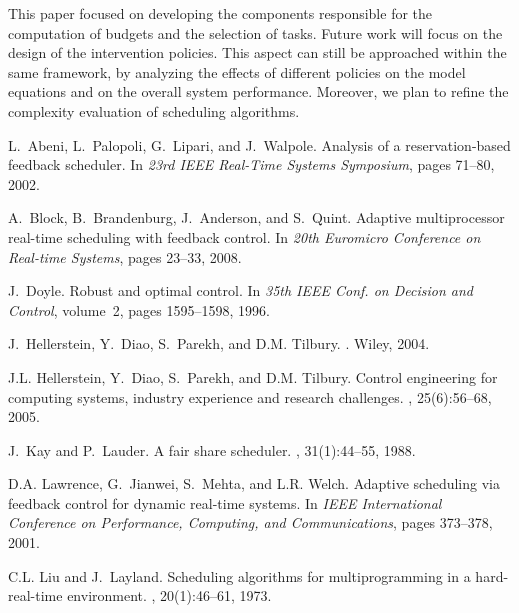 \documentclass[a4paper]{article}
\begin{document}
This paper focused on developing the components responsible for the computation 
of budgets and the selection of tasks.
Future work will focus on the design of the intervention policies.
This aspect can still be approached within the same framework, by analyzing 
the effects of different policies on the model equations and on the overall 
system performance.
Moreover, we plan to refine the complexity evaluation of scheduling algorithms.



\begin{thebibliography}{10}

L.~Abeni, L.~Palopoli, G.~Lipari, and J.~Walpole.
\newblock Analysis of a reservation-based feedback scheduler.
\newblock In {\em 23rd IEEE Real-Time Systems Symposium}, pages 71--80, 2002.

A.~Block, B.~Brandenburg, J.~Anderson, and S.~Quint.
\newblock Adaptive multiprocessor real-time scheduling with feedback control.
\newblock In {\em 20th Euromicro Conference on Real-time Systems}, pages
  23--33, 2008.

J.~Doyle.
\newblock Robust and optimal control.
\newblock In {\em 35th IEEE Conf. on Decision and Control}, volume~2, pages
  1595--1598, 1996.

J.~Hellerstein, Y.~Diao, S.~Parekh, and D.M. Tilbury.
.
\newblock Wiley, 2004.

J.L. Hellerstein, Y.~Diao, S.~Parekh, and D.M. Tilbury.
\newblock Control engineering for computing systems, industry experience and
  research challenges.
, 25(6):56--68, 2005.

J.~Kay and P.~Lauder.
\newblock A fair share scheduler.
, 31(1):44--55, 1988.

D.A. Lawrence, G.~Jianwei, S.~Mehta, and L.R. Welch.
\newblock Adaptive scheduling via feedback control for dynamic real-time
  systems.
\newblock In {\em IEEE International Conference on Performance, Computing, and
  Communications}, pages 373--378, 2001.

C.L. Liu and J.~Layland.
\newblock Scheduling algorithms for multiprogramming in a hard-real-time
  environment.
, 20(1):46--61, 1973.


\end{thebibliography}
\end{document}

